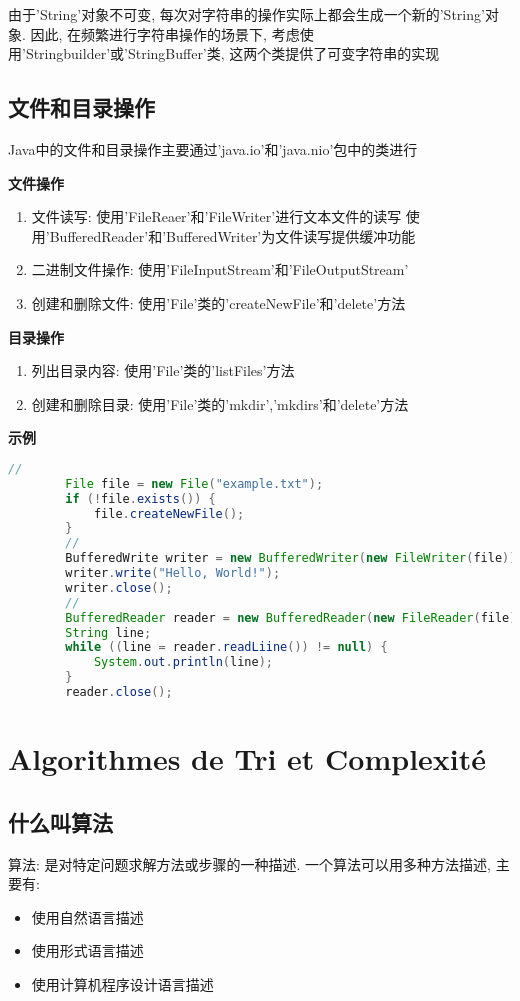 \documentclass{article}
\begin{document}
由于'String'对象不可变, 每次对字符串的操作实际上都会生成一个新的'String'对象. 因此, 在频繁进行字符串操作的场景下, 考虑使用'Stringbuilder'或'StringBuffer'类, 这两个类提供了可变字符串的实现
\subsection{ 文件和目录操作}
Java中的文件和目录操作主要通过'java.io'和'java.nio'包中的类进行

\textbf{文件操作}

\begin{enumerate}
    \item 文件读写:
    \subitem 使用'FileReaer'和'FileWriter'进行文本文件的读写
    \subitem 使用'BufferedReader'和'BufferedWriter'为文件读写提供缓冲功能
    \item 二进制文件操作:
    \subitem 使用'FileInputStream'和'FileOutputStream'
    \item 创建和删除文件:
    \subitem 使用'File'类的'createNewFile'和'delete'方法
\end{enumerate}

\textbf{目录操作}
\begin{enumerate}
    \item 列出目录内容:
    \subitem 使用'File'类的'listFiles'方法
    \item 创建和删除目录:
    \subitem 使用'File'类的'mkdir','mkdirs'和'delete'方法
\end{enumerate}

\textbf{示例}

\begin{tcolorbox}
    \begin{lstlisting}[language=java]
        //
        File file = new File("example.txt");
        if (!file.exists()) {
            file.createNewFile();
        }
        //
        BufferedWrite writer = new BufferedWriter(new FileWriter(file));
        writer.write("Hello, World!");
        writer.close();
        //
        BufferedReader reader = new BufferedReader(new FileReader(file));
        String line;
        while ((line = reader.readLiine()) != null) {
            System.out.println(line);
        }
        reader.close();
    \end{lstlisting}
\end{tcolorbox}
\section{ Algorithmes de Tri et Complexité}
\subsection{ 什么叫算法}
算法: 是对特定问题求解方法或步骤的一种描述. 一个算法可以用多种方法描述, 主要有:
\begin{itemize}
    \item 使用自然语言描述
    \item 使用形式语言描述
    \item 使用计算机程序设计语言描述
\end{itemize}
\end{document}
